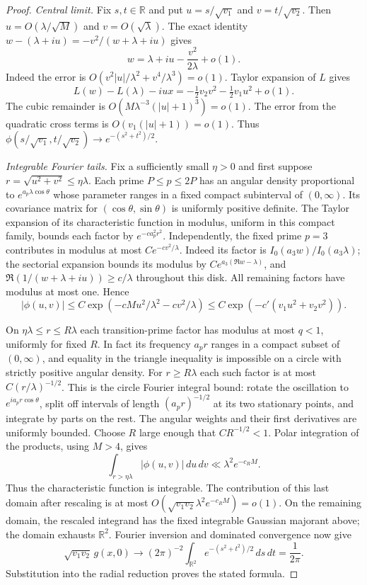 \documentclass[11pt]{article}
\begin{document}
\begin{proof}
\emph{Central limit.}
Fix $s,t\in\mathbb R$ and put $u=s/\sqrt{v_1}$ and $v=t/\sqrt{v_2}$.
Then $u=O(\lambda/\sqrt M)$ and $v=O(\sqrt\lambda)$. The exact
identity $w-(\lambda+iu)=-v^2/(w+\lambda+iu)$ gives
\[
 w=\lambda+iu-\frac{v^2}{2\lambda}+o(1).
\]
Indeed the error is $O(v^2|u|/\lambda^2+v^4/\lambda^3)=o(1)$.
Taylor expansion of $L$ gives
\[
 L(w)-L(\lambda)-iux=-\tfrac12v_2v^2-\tfrac12v_1u^2+o(1).
\]
The cubic remainder is $O(M\lambda^{-3}(|u|+1)^3)=o(1)$.
The error from the quadratic cross terms is
$O(v_1(|u|+1))=o(1)$. Thus
$\phi(s/\sqrt{v_1},t/\sqrt{v_2})\to e^{-(s^2+t^2)/2}$.

\emph{Integrable Fourier tails.}
Fix a sufficiently small $\eta>0$ and first suppose
$r=\sqrt{u^2+v^2}\le\eta\lambda$.
Each prime $P\le p\le2P$ has an angular density proportional to
$e^{a_p\lambda\cos\theta}$ whose parameter ranges in a fixed compact
subinterval of $(0,\infty)$. Its covariance matrix for
$(\cos\theta,\sin\theta)$ is uniformly positive definite.
The Taylor expansion of its characteristic function in modulus,
uniform in this compact family, bounds each factor by
$e^{-c a_p^2r^2}$. Independently, the fixed prime $p=3$ contributes in
modulus at most $C e^{-c v^2/\lambda}$. Indeed its factor is
$I_0(a_3w)/I_0(a_3\lambda)$; the sectorial expansion bounds its
modulus by $C e^{a_3(\Re w-\lambda)}$, and
$\Re(1/(w+\lambda+iu))\ge c/\lambda$ throughout this disk.
All remaining factors have modulus at most one. Hence
\[
 |\phi(u,v)|\le C\exp(-cM u^2/\lambda^2-cv^2/\lambda)
 \le C\exp(-c'(v_1u^2+v_2v^2)).
\]

On $\eta\lambda\le r\le R\lambda$ each transition-prime factor has
modulus at most $q<1$, uniformly for fixed $R$. In fact its frequency
$a_pr$ ranges in a compact subset of $(0,\infty)$, and equality in
the triangle inequality is impossible on a circle with strictly positive
angular density. For $r\ge R\lambda$ each such factor is at most
$C(r/\lambda)^{-1/2}$. This is the circle Fourier integral bound:
rotate the oscillation to $e^{ia_pr\cos\theta}$, split off intervals of
length $(a_pr)^{-1/2}$ at its two stationary points, and integrate by
parts on the rest. The angular weights and their first derivatives are
uniformly bounded. Choose $R$ large enough that $CR^{-1/2}<1$.
Polar integration of the products, using $M>4$, gives
\[
 \int_{r>\eta\lambda}|\phi(u,v)|\,du\,dv
 \ll \lambda^2e^{-c_R M}.
\]
Thus the characteristic function is integrable. The contribution of this
last domain after rescaling is at most
$O(\sqrt{v_1v_2}\lambda^2e^{-c_R M})=o(1)$.
On the remaining domain, the rescaled integrand has the fixed integrable
Gaussian majorant above; the domain exhausts $\mathbb R^2$.
Fourier inversion and dominated convergence now give
\[
 \sqrt{v_1v_2}\,g(x,0)\longrightarrow
 (2\pi)^{-2}\int_{\mathbb R^2}e^{-(s^2+t^2)/2}\,ds\,dt
 =\frac1{2\pi}.
\]
Substitution into the radial reduction proves the stated formula.
\end{proof}
\end{document}
